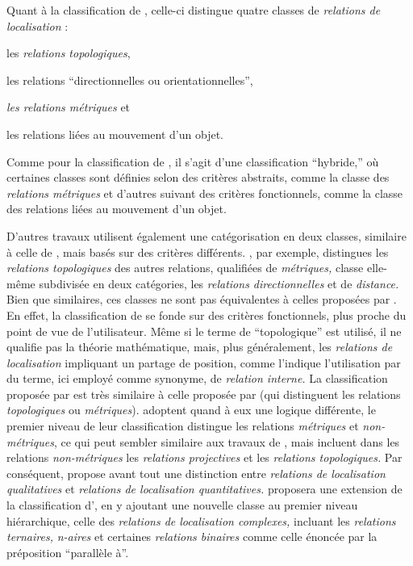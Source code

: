 Quant à la classification de \textcite{Pustejovsky2017}, celle-ci
distingue quatre classes de \emph{relations de localisation} :
%
\begin{enumerate*}[label=(\alph*)]
\item les \emph{relations topologiques},
  \item les relations \enquote{directionnelles ou
  orientationnelles},
  \item \emph{les relations métriques} et
  \item les relations liées au mouvement d'un objet.
\end{enumerate*}
%
Comme pour la classification de \textcite{Bateman2010}, il s'agit
d'une classification \enquote{hybride,} où certaines classes sont
définies selon des critères abstraits, comme la classe des
\emph{relations métriques} et d'autres suivant des critères
fonctionnels, comme la classe des relations liées au mouvement d'un
objet.

D'autres travaux \autocite{Hudelot2008a} utilisent également une
catégorisation en deux classes, similaire à celle de
\textcite{Borillo1998}, mais basés sur des critères
différents. \textcite{Hudelot2008a}, par exemple, distingues les
\emph{relations topologiques} des autres relations, qualifiées de
\emph{métriques,} classe elle-même subdivisée en deux catégories, les
\emph{relations directionnelles} et de \emph{distance.} Bien que
similaires, ces classes ne sont pas équivalentes à celles proposées
par \textcite{Borillo1998}. En effet, la classification de
\textcite{Borillo1998} se fonde sur des critères fonctionnels, plus
proche du point de vue de l'utilisateur. Même si le terme de
\enquote{topologique} est utilisé, il ne qualifie pas la théorie
mathématique, mais, plus généralement, les \emph{relations de
  localisation} impliquant un partage de position, comme l'indique
l'utilisation par \textcite{Borillo1998} du terme, ici employé comme
synonyme, de \emph{relation interne.} La classification proposée par
\textcite{Hudelot2008a} est très similaire à celle proposée par
\textcite{Kuipers1988} (qui distinguent les relations
\emph{topologiques} ou \emph{métriques}). \textcite{Louwsma2006}
adoptent quand à eux une logique différente, le premier niveau de leur
classification distingue les relations \emph{métriques} et
\emph{non-métriques}, ce qui peut sembler similaire aux travaux de
\textcite{kuipers1988,Hudelot2008a}, mais \textcite{Louwsma2006}
incluent dans les relations \emph{non-métriques} les \emph{relations
  projectives} et les \emph{relations topologiques.} Par conséquent,
propose avant tout une distinction entre \emph{relations de
  localisation qualitatives} et \emph{relations de localisation
  quantitatives.} \textcite{Bloch2013} proposera une extension de la
classification d'\textcite{Hudelot2008a}, en y ajoutant une nouvelle
classe au premier niveau hiérarchique, celle des \emph{relations de
  localisation complexes,} incluant les \emph{relations ternaires,}
\emph{n-aires} et certaines \emph{relations binaires} comme celle
énoncée par la préposition \enquote{parallèle à}.

